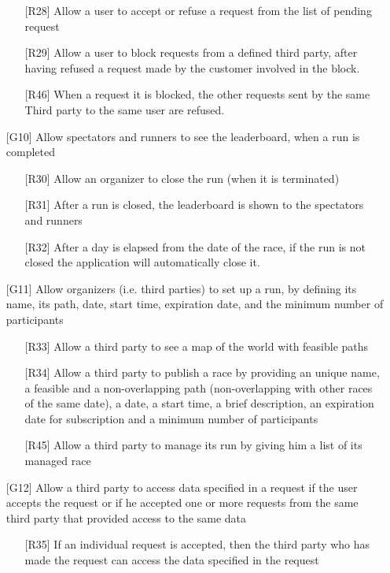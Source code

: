 \begin{itemize}
\begin{itemize}
	\item[{[R28]}] Allow a user to accept or refuse a request from the list of pending request
	\item[{[R29]}] Allow a user to block requests from a defined third party, after having refused a request made by the customer
	involved in the block.
	\item[{[R46]}] When a request it is blocked, the other requests sent by the same Third party to the same user are refused.
	\end{itemize}	
\item[{[G10]}] Allow spectators and runners to see the leaderboard, when a run is completed
	\begin{itemize}
	\item[{[R30]}] Allow an organizer to close the run (when it is terminated)
	\item[{[R31]}] After a run is closed, the leaderboard is shown to the spectators and runners
	\item[{[R32]}] After a day is elapsed from the date of the race, if the run is not closed the application will automatically close it.
	\end{itemize}
\item[{[G11]}] Allow organizers (i.e. third parties) to set up a run, by defining its name, its path, date, start time, expiration date, and the minimum number of participants
	\begin{itemize}
	\item[{[R33]}] Allow a third party to see a map of the world with feasible paths
	\item[{[R34]}] Allow a third party to publish a race by providing an unique name, a feasible and a non-overlapping path (non-overlapping with other races of the same date), a date, a start time, a brief description, an expiration date for subscription and a minimum number of participants
	\item[{[R45]}] Allow a third party to manage its run by giving him a list of its managed race
	\end{itemize}
\item[{[G12]}] Allow a third party to access data specified in a request if the user accepts the request or if he accepted one or more requests from the same third party that provided access to the same data 
	\begin{itemize}
	\item[{[R35]}] If an individual request is accepted, then the third party who has made the request can access the data specified in the request

\end{itemize}
\end{itemize}
